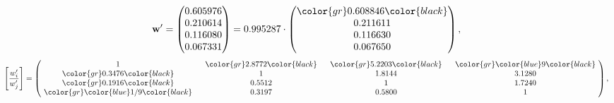 \begin{example}
\begin{equation*}
\mathbf{w}^{\prime} =
\begin{pmatrix}
0.605976\\
0.210614\\
0.116080\\
0.067331
\end{pmatrix} =
0.995287\cdot
\begin{pmatrix}
\color{gr} 0.608846\color{black} \\
0.211611\\
0.116630\\
0.067650
\end{pmatrix},
\end{equation*}
\begin{equation*}
\left[ \frac{{w}^{\prime}_i}{{w}^{\prime}_j} \right] =
\begin{pmatrix}
$\,\,$ 1 $\,\,$ & $\,\,$\color{gr} 2.8772\color{black} $\,\,$ & $\,\,$\color{gr} 5.2203\color{black} $\,\,$ & $\,\,$\color{gr} \color{blue} 9\color{black} $\,\,$ \\
$\,\,$\color{gr} 0.3476\color{black} $\,\,$ & $\,\,$ 1 $\,\,$ & $\,\,$1.8144$\,\,$ & $\,\,$3.1280  $\,\,$ \\
$\,\,$\color{gr} 0.1916\color{black} $\,\,$ & $\,\,$0.5512$\,\,$ & $\,\,$ 1 $\,\,$ & $\,\,$1.7240 $\,\,$ \\
$\,\,$\color{gr} \color{blue}  1/9\color{black} $\,\,$ & $\,\,$0.3197$\,\,$ & $\,\,$0.5800$\,\,$ & $\,\,$ 1  $\,\,$ \\
\end{pmatrix},
\end{equation*}
\end{example}
\newpage
